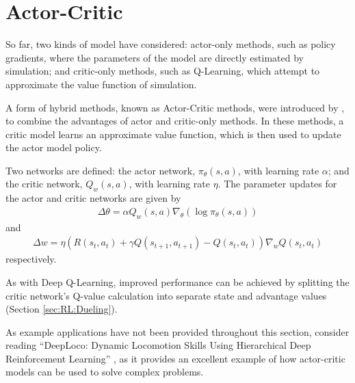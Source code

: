 \section{Actor-Critic}

So far, two kinds of model have considered:
actor-only methods, such as policy gradients, where the parameters of the model
are directly estimated by simulation;
and critic-only methods, such as Q-Learning, which attempt to approximate the
value function of simulation.

A form of hybrid methods, known as Actor-Critic methods, were introduced by
\cite{Konda:2000:Actor}, to combine the advantages of actor and critic-only
methods.
In these methods, a critic model learns an approximate value function, which is
then used to update the actor model policy.

Two networks are defined:
the actor network, $\pi_\theta(s,a)$, with learning rate $\alpha$;
and the critic network, $Q_w(s,a)$, with learning rate $\eta$.
The parameter updates for the actor and critic networks are given by
\begin{align*}
    \Delta\theta = \alpha Q_w(s,a)\nabla_\theta(\log\pi_\theta(s,a))
\end{align*}
and
\begin{align*}
    \Delta w = \eta (R(s_t,a_t) + \gamma Q(s_{t+1},a_{t+1}) - Q(s_t,a_t))\nabla_wQ(s_t,a_t)
\end{align*}
respectively.

As with Deep Q-Learning, improved performance can be achieved by splitting the
critic network's Q-value calculation into separate state and advantage values
(Section \ref{sec:RL:Dueling}).

As example applications have not been provided throughout this section, consider
reading ``DeepLoco: Dynamic Locomotion Skills Using Hierarchical Deep
Reinforcement Learning'' \citep{Peng:2017:Deeploco}, as it provides an excellent
example of how actor-critic models can be used to solve complex problems.

